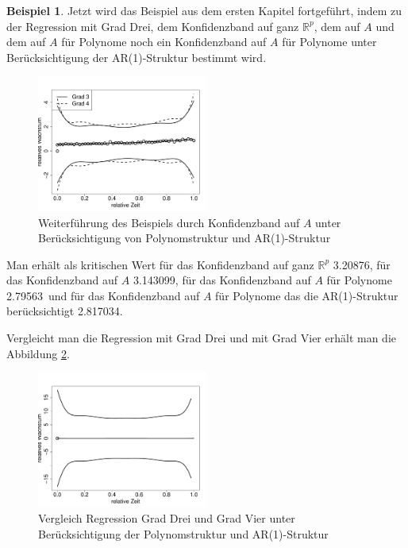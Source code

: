 \documentclass[12pt,a4paper]{article}
\theoremstyle{definition}
\newtheorem{Beispiel}[Definition]{Beispiel}
\theoremstyle{definition}
\theoremstyle{definition}
\theoremstyle{definition}
\newcommand{\cR}{3.20876}
\newcommand{\cA}{3.143099}
\newcommand{\cAP}{2.79563}
\newcommand{\cAPAR}{2.817034}
\begin{document}
\begin{Beispiel}
Jetzt wird das Beispiel aus dem ersten Kapitel fortgeführt, indem zu der Regression mit Grad Drei, dem Konfidenzband auf ganz $\mathbb{R}^{p}$, dem auf $A$ und dem auf $A$ für Polynome noch ein Konfidenzband auf $A$ für Polynome unter Berücksichtigung der AR(1)-Struktur bestimmt wird.

\begin{figure}[H] 
  \centering
     \includegraphics[width=0.5\textwidth]{Bsp-KB-poly-AR}
  \caption{Weiterführung des Beispiels durch Konfidenzband auf $A$ unter Berücksichtigung von Polynomstruktur und AR(1)-Struktur}
  \label{Bsp-KB-poly-AR}
\end{figure}

Man erhält als kritischen Wert für das Konfidenzband auf ganz $\mathbb{R}^{p}$ \cR , für das Konfidenzband auf $A$ \cA, für das Konfidenzband auf $A$ für Polynome \cAP ~und für das Konfidenzband auf $A$ für Polynome das die AR(1)-Struktur berücksichtigt \cAPAR . 

Vergleicht man die Regression mit Grad Drei und mit Grad Vier erhält man die Abbildung \ref{Bsp-KB-poly-hetero-AR}.

\begin{figure}[H] 
  \centering
     \includegraphics[width=0.5\textwidth]{Bsp-KB-poly-hetero-AR}
  \caption{Vergleich Regression Grad Drei und Grad Vier unter Berücksichtigung der Polynomstruktur und AR(1)-Struktur}
  \label{Bsp-KB-poly-hetero-AR}
\end{figure}


\end{Beispiel}
\end{document}

